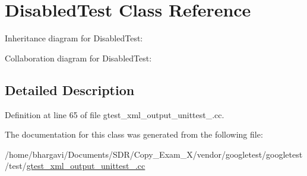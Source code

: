 \hypertarget{class_disabled_test}{}\section{Disabled\+Test Class Reference}
\label{class_disabled_test}


Inheritance diagram for Disabled\+Test\+:


Collaboration diagram for Disabled\+Test\+:


\subsection{Detailed Description}


Definition at line 65 of file gtest\+\_\+xml\+\_\+output\+\_\+unittest\+\_\+.\+cc.



The documentation for this class was generated from the following file\+:\begin{DoxyCompactItemize}
\item 
/home/bhargavi/\+Documents/\+S\+D\+R/\+Copy\+\_\+\+Exam\+\_\+X/vendor/googletest/googletest/test/\hyperlink{gtest__xml__output__unittest___8cc}{gtest\+\_\+xml\+\_\+output\+\_\+unittest\+\_\+.\+cc}\end{DoxyCompactItemize}
